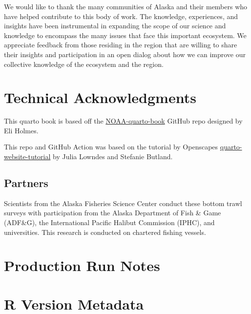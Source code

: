 \documentclass[
  letterpaper,
  oneside,
  open=any]{scrbook}
\begin{document}
We would like to thank the many communities of Alaska and their members
who have helped contribute to this body of work. The knowledge,
experiences, and insights have been instrumental in expanding the scope
of our science and knowledge to encompass the many issues that face this
important ecosystem. We appreciate feedback from those residing in the
region that are willing to share their insights and participation in an
open dialog about how we can improve our collective knowledge of the
ecosystem and the region.

\hypertarget{technical-acknowledgments}{%
\chapter{Technical Acknowledgments}\label{technical-acknowledgments}}

This quarto book is based off the
\href{https://github.com/nmfs-opensci/NOAA-quarto-book}{NOAA-quarto-book}
GitHub repo designed by Eli Holmes.

This repo and GitHub Action was based on the tutorial by Openscapes
\href{https://github.com/Openscapes/quarto-website-tutorial}{quarto-website-tutorial}
by Julia Lowndes and Stefanie Butland.

\hypertarget{partners}{%
\section{Partners}\label{partners}}

Scientists from the Alaska Fisheries Science Center conduct these bottom
trawl surveys with participation from the Alaska Department of Fish \&
Game (ADF\&G), the International Pacific Halibut Commission (IPHC), and
universities. This research is conducted on chartered fishing vessels.

\hypertarget{production-run-notes}{%
\chapter{Production Run Notes}\label{production-run-notes}}

\hypertarget{r-version-metadata}{%
\chapter{R Version Metadata}\label{r-version-metadata}}
\end{document}
